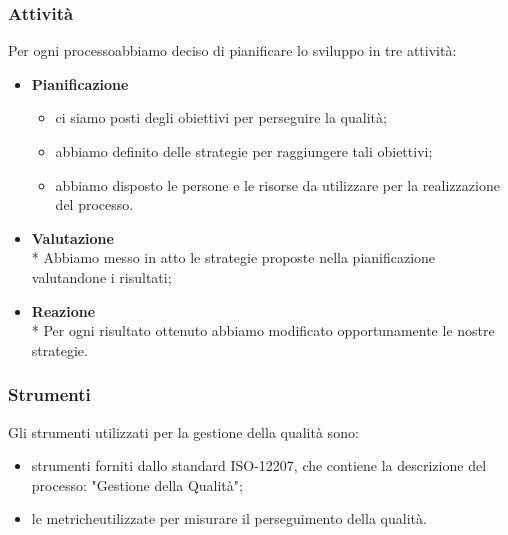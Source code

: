 \subsubsection{Attività}
Per ogni processo\glosp abbiamo deciso di pianificare lo sviluppo in tre attività:
\begin{itemize}
	\item \textbf{Pianificazione}
		\begin{itemize}
			\item ci siamo posti degli obiettivi per perseguire la qualità;
			\item abbiamo definito delle strategie per raggiungere tali obiettivi;
			\item abbiamo disposto le persone e le risorse da utilizzare per la realizzazione del processo\glo.
		\end{itemize}
	\item \textbf{Valutazione} \\*
		Abbiamo messo in atto le strategie proposte nella pianificazione valutandone i risultati;
	\item \textbf{Reazione} \\*
		Per ogni risultato ottenuto abbiamo modificato opportunamente le nostre strategie.
\end{itemize}
\subsubsection{Strumenti}
Gli strumenti utilizzati per la gestione della qualità sono:
\begin{itemize}
	\item strumenti forniti dallo standard ISO-12207, che contiene la descrizione del processo\glo: "Gestione della Qualità";
	\item le metriche\glosp utilizzate per misurare il perseguimento della qualità.
\end{itemize}
